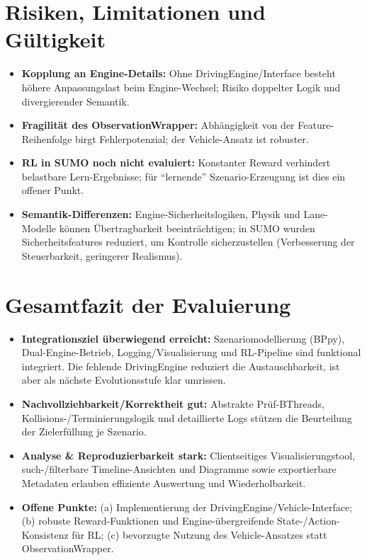 \section{Risiken, Limitationen und Gültigkeit}
\begin{itemize}
  \item \textbf{Kopplung an Engine-Details:} Ohne DrivingEngine/Interface besteht höhere Anpassungslast beim Engine-Wechsel; Risiko doppelter Logik und divergierender Semantik.
  \item \textbf{Fragilität des ObservationWrapper:} Abhängigkeit von der Feature-Reihenfolge birgt Fehlerpotenzial; der Vehicle-Ansatz ist robuster.
  \item \textbf{RL in SUMO noch nicht evaluiert:} Konstanter Reward verhindert belastbare Lern-Ergebnisse; für \enquote{lernende} Szenario-Erzeugung ist dies ein offener Punkt.
  \item \textbf{Semantik-Differenzen:} Engine-Sicherheitslogiken, Physik und Lane-Modelle können Übertragbarkeit beeinträchtigen; in SUMO wurden Sicherheitsfeatures reduziert, um Kontrolle sicherzustellen (Verbesserung der Steuerbarkeit, geringerer Realismus).
\end{itemize}

\section{Gesamtfazit der Evaluierung}
\begin{itemize}
  \item \textbf{Integrationsziel überwiegend erreicht:} Szenariomodellierung (BPpy), Dual-Engine-Betrieb, Logging/Visualisierung und RL-Pipeline sind funktional integriert. Die fehlende DrivingEngine reduziert die Austauschbarkeit, ist aber als nächste Evolutionsstufe klar umrissen.
  \item \textbf{Nachvollziehbarkeit/Korrektheit gut:} Abstrakte Prüf-BThreads, Kollisions-/Terminierungslogik und detaillierte Logs stützen die Beurteilung der Zielerfüllung je Szenario.
  \item \textbf{Analyse \& Reproduzierbarkeit stark:} Clientseitiges Visualisierungstool, such-/filterbare Timeline-Ansichten und Diagramme sowie exportierbare Metadaten erlauben effiziente Auswertung und Wiederholbarkeit.
  \item \textbf{Offene Punkte:} (a) Implementierung der DrivingEngine/Vehicle-Interface; (b) robuste Reward-Funktionen und Engine-übergreifende State-/Action-Konsistenz für RL; (c) bevorzugte Nutzung des Vehicle-Ansatzes statt ObservationWrapper.
\end{itemize}

